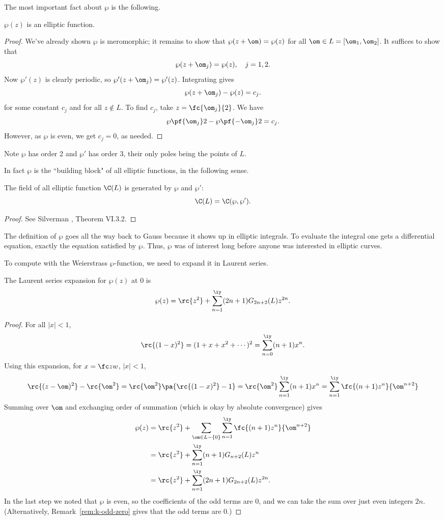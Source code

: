The most important fact about $\wp$ is the following.
\begin{thm}
$\wp(z)$ is an elliptic function.
\end{thm}
\begin{proof}
We've already shown $\wp$ is meromorphic; it remains to show that $\wp(z+\om)=\wp(z)$ for all $\om\in L=[\om_1,\om_2]$. It suffices to show that
\[
\wp(z+\om_j)=\wp(z),\quad j=1,2.
\]
Now $\wp'(z)$ is clearly periodic, so $\wp'(z+\om_j)=\wp'(z)$. Integrating gives
\[
\wp(z+\om_j)-\wp(z)=c_j.
\]
for some constant $c_j$ and for all $z\nin L$. To find $c_j$, take $z=\fc{\om_j}{2}$. We have
\[
\wp\pf{\om_j}2-\wp\pf{-\om_j}2=c_j.
\]
However, as $\wp$ is even, we get $c_j=0$, as needed.
\end{proof}
Note $\wp$ has order 2 and $\wp'$ has order 3, their only poles being the points of $L$.

In fact $\wp$ is the ``building block" of all elliptic functions, in the following sense.
\begin{thm}
The field of all elliptic function $\C(L)$ is generated by $\wp$ and $\wp'$:
\[
\C(L)=\C(\wp,\wp').
\]
\end{thm}
\begin{proof}
See Silverman \cite{Si86}, Theorem VI.3.2.
\end{proof}
The definition of $\wp$ goes all the way back to Gauss because it shows up in elliptic integrals. To evaluate the integral one gets a differential equation, exactly the equation satisfied by $\wp$. Thus, $\wp$ was of interest long before anyone was interested in elliptic curves.

To compute with the Weierstrass $\wp$-function, we need to expand it in Laurent series.
\begin{thm}
The Laurent series expansion for $\wp(z)$ at 0 is
\[
\wp(z)=\rc{z^2}+\sum_{n=1}^{\iy} (2n+1)G_{2n+2}(L)z^{2n}.
\]
\end{thm}
\begin{proof}
For all $|x|<1$,
\[
\rc{(1-x)^2}=(1+x+x^2+\cdots )^2=\sum_{n=0}^{\iy} (n+1)x^n.
\]
Using this expansion, for $x=\fc zw$, $|x|<1$, 
\[
\rc{(z-\om)^2}-\rc{\om^2} =\rc{\om^2}
\pa{
\rc{(1-x)^2}-1
}=
\rc{\om^2}
\sum_{n=1}^{\iy}(n+1)x^n
=\sum_{n=1}^{\iy} \fc{(n+1)z^n}{\om^{n+2}}
\]
Summing over $\om$ and exchanging order of summation (which is okay by absolute convergence) gives
\begin{align*}
\wp(z)&=
\rc{z^2}+\sum_{\om\in L-\{0\}} \sum_{n=1}^{\iy}
\fc{(n+1)z^n}{\om^{n+2}}\\
&=\rc{z^2}+ \sum_{n=1}^{\iy} (n+1)G_{n+2}(L)z^n\\
&=\rc{z^2}+ \sum_{n=1}^{\iy} (2n+1)G_{2n+2}(L)z^{2n}.
\end{align*}
In the last step we noted that $\wp$ is even, so the coefficients of the odd terms are 0, and we can take the sum over just even integers $2n$. (Alternatively, Remark~\ref{rem:k-odd-zero} gives that the odd terms are 0.)
\end{proof}
